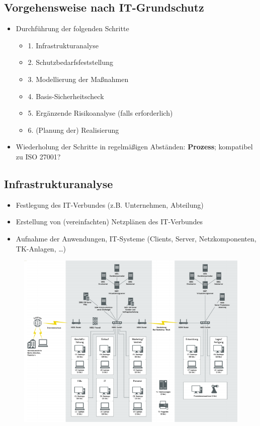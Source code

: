 \documentclass[openany]{book}
\begin{document}
\subsection{Vorgehensweise nach IT-Grundschutz}

\begin{itemize}
    \item Durchführung der folgenden Schritte
    \begin{itemize}
        \item 1. Infrastrukturanalyse
        \item 2. Schutzbedarfsfeststellung
        \item 3. Modellierung der Maßnahmen
        \item 4. Basis-Sicherheitscheck
        \item 5. Ergänzende Risikoanalyse (falls erforderlich)
        \item 6. (Planung der) Realisierung
    \end{itemize}
    \item Wiederholung der Schritte in regelmäßigen Abständen: \textbf{Prozess}; kompatibel zu ISO 27001?
\end{itemize}

\subsection{Infrastrukturanalyse}

\begin{itemize}
    \item Festlegung des IT-Verbundes (z.B. Unternehmen, Abteilung)
    \item Erstellung von (vereinfachten) Netzplänen des IT-Verbundes
    \item Aufnahme der Anwendungen, IT-Systeme (Clients, Server, Netzkomponenten, TK-Anlagen, \dots)
\end{itemize}

\newpage

\begin{figure}[h!]
    \centering
    \includegraphics[width=\linewidth]{Pics/InfrastructureAnalysis.PNG}
\end{figure}
\end{document}
